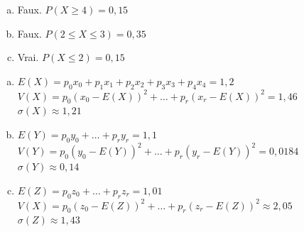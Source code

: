 \documentclass[12pt, a4paper]{article}
\begin{document}
    \begin{Exercise}[number={40}]
      \begin{enumerate}[a)]
        \item Faux. $P(X\geq 4)=0{,}15$ \medbreak
        \item Faux. $P(2\leq X\leq 3)=0{,}35$ \medbreak
        \item Vrai. $P(X\leq 2)=0{,}15$
      \end{enumerate}
    \end{Exercise}

    \begin{Exercise}[number={50}]
      \begin{enumerate}[a)]
        \item $E(X)=p_0x_0+p_1x_1+p_2x_2+p_3x_3+p_4x_4=1{,}2$ \\ $V(X)=p_0(x_0-E(X))^2+\dots+p_r(x_r-E(X))^2=1{,}46$ \\ $\sigma(X)\approx 1{,}21$
        \item $E(Y)=p_0y_0+\dots+p_ry_r=1{,}1$ \\ $V(Y)=p_0(y_0-E(Y))^2+\dots+p_r(y_r-E(Y))^2=0{,}0184$ \\ $\sigma(Y)\approx 0{,}14$
        \item $E(Z)=p_0z_0+\dots+p_rz_r=1{,}01$ \\ $V(X)=p_0(z_0-E(Z))^2+\dots+p_r(z_r-E(Z))^2\approx 2{,}05$ \\ $\sigma(Z)\approx  1{,}43$
      \end{enumerate}
    \end{Exercise}
\end{document}
